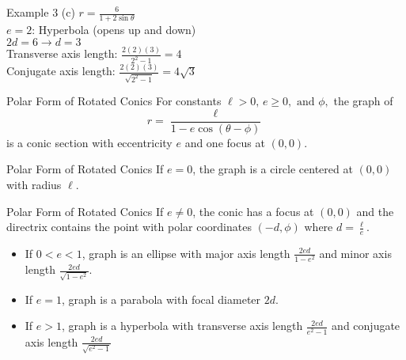 \documentclass[t,usenames,dvipsnames]{beamer}
\begin{document}
\begin{frame}{Example 3}
(c) \quad $r = \frac{6}{1+2\sin\theta}$ \newline\\  \pause
$e = 2$: Hyperbola (opens up and down) \newline\\ \pause
$2d = 6 \longrightarrow d = 3$  \newline\\  \pause
Transverse axis length: $\frac{2(2)(3)}{2^2-1} = 4$ \\[15pt]    \pause
Conjugate axis length: $\frac{2(2)(3)}{\sqrt{2^2-1}} = 4\sqrt{3}$
\end{frame}


\begin{frame}{Polar Form of Rotated Conics}
For constants $\ell > 0, \, e \geq 0, \text{ and } \phi,$ the graph of 
\[
r = \frac{\ell}{1-e\cos(\theta-\phi)}
\]
is a conic section with eccentricity $e$ and one focus at $(0,0)$.
\end{frame}

\begin{frame}{Polar Form of Rotated Conics}
    If $e = 0$, the graph is a circle centered at $(0,0)$ with radius $\ell$.
\end{frame}

\begin{frame}{Polar Form of Rotated Conics}
    If $e \neq 0$, the conic has a focus at $(0,0)$ and the directrix contains the point with polar coordinates $(-d,\phi)$ where $d = \frac{\ell}{e}$.
    \begin{itemize}
        \item If $0 < e < 1$, graph is an ellipse with major axis length $\frac{2ed}{1-e^2}$ and minor axis length $\frac{2ed}{\sqrt{1-e^2}}$. \\[15pt] \pause
        \item If $e=1$, graph is a parabola with focal diameter $2d$.   \\[15pt]    \pause
        \item If $e > 1$, graph is a hyperbola with transverse axis length $\frac{2ed}{e^2-1}$ and conjugate axis length $\frac{2ed}{\sqrt{e^2-1}}$
    \end{itemize}
\end{frame}
\end{document}
